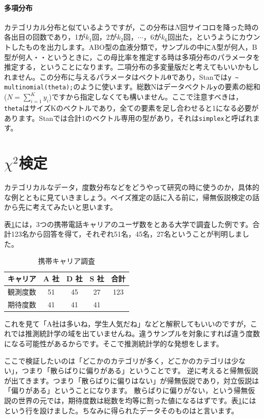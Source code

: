 \documentclass{ltjsbook}
\begin{document}
\paragraph{多項分布}
カテゴリカル分布と似ているようですが，この分布は$N$回サイコロを降った時の各出目の回数であり，1が$k_1$回，2が$k_2$回，$\cdots$，6が$k_6$回出た，というようにカウントしたものを出力します。ABO型の血液分類で，サンプルの中にA型が何人，B型が何人・・というときに，この母比率を推定する時は多項分布のパラメータを推定する，ということになります。二項分布の多変量版だと考えてもいいかもしれません\citep{松浦201610}。この分布に与えるパラメータはベクトル$\bm{\theta}$であり，Stanでは\verb|y ~ multinomial(theta);|のように使います。総数Nはデータベクトル$\bm{y}$の要素の総和($N=\sum_{i=1}^K y_i$)ですから指定しなくても構いません。ここで注意すべきは，\verb|theta|はサイズKのベクトルであり，全ての要素を足し合わせると1になる必要があります。Stanでは合計1のベクトル専用の型があり，それは\verb|simplex|と呼ばれます。

\section{$\chi^2$検定}
カテゴリカルなデータ，度数分布などをどうやって研究の時に使うのか，具体的な例とともに見ていきましょう。ベイズ推定の話に入る前に，帰無仮説検定の話から先に考えてみたいと思います。

表\ref{tbl:23_01}には，3つの携帯電話キャリアのユーザ数をとある大学で調査した例です。合計123名から回答を得て，それぞれ51名，45名，27名ということが判明しました。
\begin{table}[ht]
    \centering
    \caption{携帯キャリア調査}
    \begin{tabular}{c|ccc|c}
        キャリア & A 社 & D 社 & S 社 & 合計\\\hline
        観測度数 & 51 & 45 & 27 & 123 \\
        期待度数 & 41 & 41 & 41 & \\
    \end{tabular}
    \label{tbl:23_01}
\end{table}
これを見て「A社は多いね，学生人気だね」などと解釈してもいいのですが，これでは推測統計学の域を出ていませんね。違うサンプルを対象にすれば違う度数になる可能性があるからです。そこで推測統計学的な発想をします。

ここで検証したいのは「どこかのカテゴリが多く，どこかのカテゴリは少ない」，つまり「散らばりに偏りがある」ということです。
逆に考えると帰無仮説が出てきます。つまり「散らばりに偏りはない」が帰無仮説であり，対立仮説は「偏りがある」ということになります。
散らばりに偏りがない，という帰無仮説の世界の元では，期待度数は総数を均等に割った値になるはずです。表\ref{tbl:23_01}にはという行を設けました。ちなみに得られたデータそのものはと言います。
\end{document}
